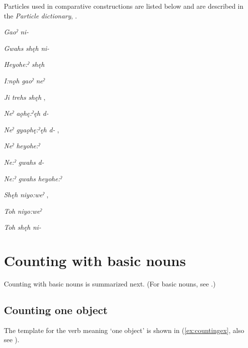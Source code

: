 Particles used in comparative constructions are listed below and are described in the \textit{Particle dictionary}, .

\begin{CayugaRelated}


\item{}\textit{Gaoˀ ni-} 

\item{}\textit{Gwahs shęh ni-} 

\item{}\textit{Heyohe:ˀ shęh } 

\item{}\textit{I:nǫh gaoˀ neˀ} 

\item{}\textit{Ji trehs shęh} , 

\item{}\textit{Neˀ aǫhę:ˀęh d-} 

\item{}\textit{Neˀ gyaǫhę:ˀęh d-} , 

\item{}\textit{Neˀ heyohe:ˀ} 

\item{}\textit{Ne:ˀ gwahs d-} 

\item{}\textit{Ne:ˀ gwahs heyohe:ˀ} 

\item{}\textit{Shęh niyo:weˀ} , 

\item{}\textit{Toh niyo:weˀ}  

\item{}\textit{Toh shęh ni-} 
\end{CayugaRelated}

\section{Counting with basic nouns} \label{ch:Counting with basic nouns}
Counting with basic nouns is summarized next. (For basic nouns, see .) 


\subsection{Counting one object} \label{ch:Counting one object}
The template for the verb meaning ‘one object’ is shown in (\ref{ex:countingex}, also see ). 

